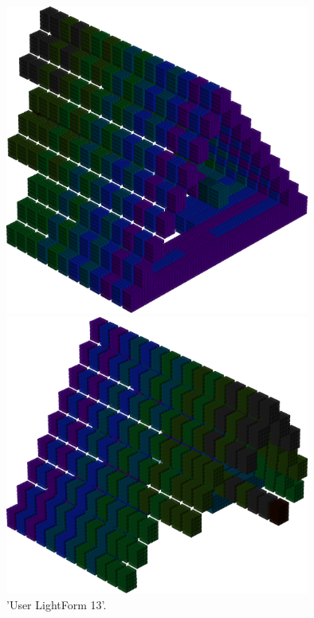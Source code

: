 \begin{minipage}[b]{0.48\linewidth}
\begin{figure}[H]
    \centering
    \begin{adjustbox}{width=5cm,margin=0cm 0cm}
      \includegraphics[width=10cm]{src/colorspace_patterns/pattern21-45.png}%
    \end{adjustbox}
    \begin{adjustbox}{width=5cm,margin=0cm 0cm}
      \includegraphics[width=10cm]{src/colorspace_patterns/pattern21-225.png}%
    \end{adjustbox}
\caption{'User LightForm 13'.}
\end{figure}
\end{minipage}
